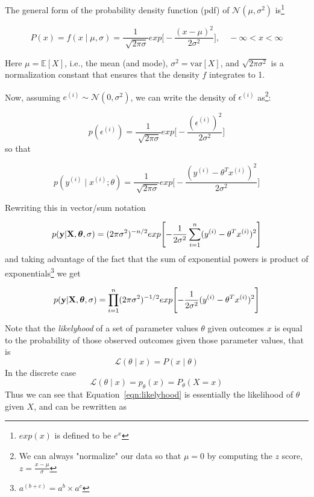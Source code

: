 \documentclass[11pt, oneside]{article}   	%
\begin{document}
\bigskip
\noindent
The general form of the probability density function (pdf) of $\mathcal{N}(\mu,\sigma^2)$ is\footnote{$exp(x)$ is defined to be $e^x$}


\begin{equation}
P(x) = f(x \mid \mu, \sigma) = \frac{1}{\sqrt[]{2 \pi \sigma}}exp\Bigg[-\frac{(x-\mu)^2}{2\sigma^2}\Bigg],  \quad - \infty  < x < \infty
\end{equation}

\bigskip
\noindent
Here $\mu = \mathbb{E}[X]$, i.e., the mean (and mode), $\sigma^2 = \textrm{var}[X]$, and
 $\sqrt{2 \pi \sigma^2}$ is a normalization constant that ensures that the density $f$ integrates to 1.

\bigskip
\noindent
Now, assuming $e^{(i)} \sim \mathcal{N}(0,\sigma^2)$, we can write the density of $\epsilon^{(i)}$ as\footnote{We can always "normalize" our data so that $\mu = 0$ by computing the $z$ score, $z =
\frac{x - \mu}{\sigma}$}:

\begin{equation}
p(\epsilon^{(i)}) = \frac{1}{\sqrt[]{2 \pi \sigma}}exp\Bigg[-\frac{(\epsilon^{(i)})^2}{2\sigma^2}\Bigg]
\label{eqn:density}
\end{equation}
so that

\begin{equation}
p(y^{(i)} \mid x^{(i)}; \theta) = \frac{1}{\sqrt[]{2 \pi \sigma}}exp\Bigg[-\frac{(y^{(i)} - \theta^{T}x^{(i)})^{2}}{2\sigma^2}\Bigg]
\label{eqn:prob_lg}
\end{equation}

\bigskip
\noindent
Rewriting this in vector/sum notation

\begin{equation}
p(\bold{y} | \bold{X}, \boldsymbol{\theta},\sigma) = (2\pi\sigma^{2})^{-n/2}exp\Bigg[{-\frac{1}{2\sigma^{2}}\sum\limits_{i = 1}^{n} (y^{(i)} - \theta^{T}x^{(i)})^2\Bigg]}
\end{equation}
and taking advantage of the fact that  the sum of exponential powers is product of exponentials\footnote{$a^{(b+c)} = a^{b} \times a^{c}$} we get

\begin{equation}
p(\bold{y} | \bold{X}, \boldsymbol{\theta},\sigma) =  \prod \limits _{i = 1}^{n}(2\pi\sigma^{2})^{-1/2} exp \Bigg[{-\frac{1}{2\sigma^{2}}(y^{(i)} - \theta^{T}x^{(i)})^2\Bigg]}
\label{eqn:likelyhood}
\end{equation}

\bigskip
\noindent
Note that the \textit{likelyhood} of a set of parameter values $\theta$  given outcomes $x$ is equal to the probability of those observed outcomes given those parameter values, that is
\begin{equation}
\mathcal{L}(\theta \mid x) = P(x \mid \theta)
\end{equation}
In the discrete case
\begin{equation}
\mathcal{L}(\theta \mid x) = p_{\theta}(x) = P_{\theta}(X = x)
\end{equation}
Thus we can see that Equation~\ref{eqn:likelyhood} is essentially the likelihood of $\theta$ given $X$, and can be rewritten as 
\end{document}
